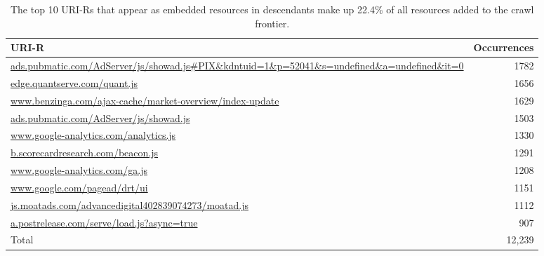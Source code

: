 \documentclass{sig-alternate}
\begin{document}



\begin{table}
\centering
\begin{tabular}{ p{5cm} | r}
\textbf{URI-R} & \textbf{Occurrences} \\
\hline
\hline
\url{ads.pubmatic.com/AdServer/js/showad.js#PIX&kdntuid=1&p=52041&s=undefined&a=undefined&it=0} & 1782 \\
\hline
\url{edge.quantserve.com/quant.js} & 1656 \\
\hline
\url{www.benzinga.com/ajax-cache/market-overview/index-update} & 1629 \\
\hline
\url{ads.pubmatic.com/AdServer/js/showad.js} & 1503 \\
\hline
\url{www.google-analytics.com/analytics.js} & 1330 \\
\hline
\url{b.scorecardresearch.com/beacon.js} & 1291 \\
\hline
\url{www.google-analytics.com/ga.js} & 1208 \\
\hline
\url{www.google.com/pagead/drt/ui} & 1151 \\
\hline
\url{js.moatads.com/advancedigital402839074273/moatad.js} & 1112 \\
\hline
\url{a.postrelease.com/serve/load.js?async=true} &  907\\
\hline
\hline
Total &  12,239\\
\hline
\end{tabular}
  \caption{The top 10 URI-Rs that appear as embedded resources in descendants make up 22.4\% of all resources added to the crawl frontier. }
  \label{counts}
\end{table}
\end{document}

